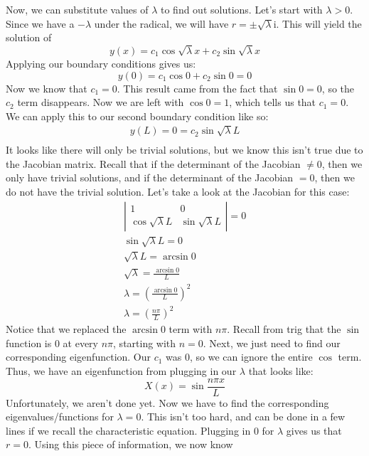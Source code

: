 \indent Now, we can substitute values of $\lambda$ to find out solutions. Let's
start with $\lambda > 0$. Since we have a $-\lambda$ under the radical, we will
have $r = \pm \sqrt{\lambda} \mathrm{i}$. This will yield the solution of
\[
y(x) = c_{1}\cos{\sqrt{\lambda}x} + c_{2}\sin{\sqrt{\lambda}x}
\]
\noindent Applying our boundary conditions gives us:
\[
y(0) = c_{1}\cos{0} + c_{2}\sin{0} = 0
\]
\noindent Now we know that $c_{1} = 0$. This result came from the fact that
$\sin{0} = 0$, so the $c_{2}$ term disappears. Now we are left with $\cos{0} = 1$,
which tells us that $c_{1} = 0$. We can apply this to our second boundary
condition like so:
\begin{gather*}
y(L) = 0 = c_{2}\sin{\sqrt{\lambda}L}\\
\end{gather*}
\noindent It looks like there will only be trivial solutions, but we know this
isn't true due to the Jacobian matrix. Recall that if the determinant of the
Jacobian $\neq 0$, then we only have trivial solutions, and if the determinant
of the Jacobian $= 0$, then we do not have the trivial solution. Let's take a
look at the Jacobian for this case:
\begin{gather*}
\left|
\begin{array}{cc}
1 & 0\\
\cos{\sqrt{\lambda}L} & \sin{\sqrt{\lambda}L}
\end{array}
\right| = 0\\
\sin{\sqrt{\lambda}L} = 0\\
\sqrt{\lambda}L = \arcsin{0}\\
\sqrt{\lambda} = \frac{\arcsin{0}}{L}\\
\lambda = \left(\frac{\arcsin{0}}{L}\right)^{2}\\
\lambda = \left(\frac{n\pi}{L}\right)^{2}
\end{gather*}
\noindent Notice that we replaced the $\arcsin{0}$ term with $n\pi$. Recall from
trig that the $\sin$ function is $0$ at every $n\pi$, starting with $n = 0$.
Next, we just need to find our corresponding eigenfunction. Our $c_{1}$ was $0$,
so we can ignore the entire $\cos$ term. Thus, we have an eigenfunction from
plugging in our $\lambda$ that looks like:
\[
X(x) = \sin{\frac{n\pi x}{L}}
\]
\indent Unfortunately, we aren't done yet. Now we have to find the corresponding
eigenvalues/functions for $\lambda = 0$. This isn't too hard, and can be done in
a few lines if we recall the characteristic equation. Plugging in $0$ for
$\lambda$ gives us that $r = 0$. Using this piece of information, we now know
